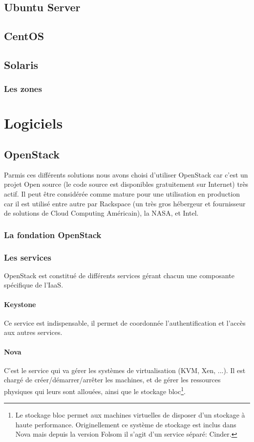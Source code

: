 \documentclass{report}
\begin{document}
\section{Ubuntu Server}

\section{CentOS}

\section{Solaris}

\subsection{Les zones}


\chapter{Logiciels}
\section{OpenStack}
Parmis ces différents solutions nous avons choisi d’utiliser OpenStack car c’est un projet Open source (le code source est disponibles gratuitement sur Internet) très actif.
Il peut être considérée comme mature pour une utilisation en production car il est utilisé entre autre par Rackspace (un très gros hébergeur et fournisseur de solutions de Cloud Computing Américain), la NASA, et Intel.

\subsection{La fondation OpenStack}


\subsection{Les services}
OpenStack est constitué de différents services gérant chacun une composante spécifique de l'IaaS.
\subsubsection{Keystone}
Ce service est indispensable, il permet de coordonnée l'authentification et l'accès aux autres services.

\subsubsection{Nova}
C'est le service qui va gérer les systèmes de virtualisation (KVM, Xen, ...). Il est chargé de créer/démarrer/arrêter les machines, et de gérer les ressources physiques qui leurs sont allouées, ainsi que le stockage bloc\footnote{Le stockage bloc permet aux machines virtuelles de disposer d'un stockage à haute performance. Originellement ce système de stockage est inclus dans Nova mais depuis la version Folsom il s'agit d'un service séparé: Cinder.}.
\end{document}
